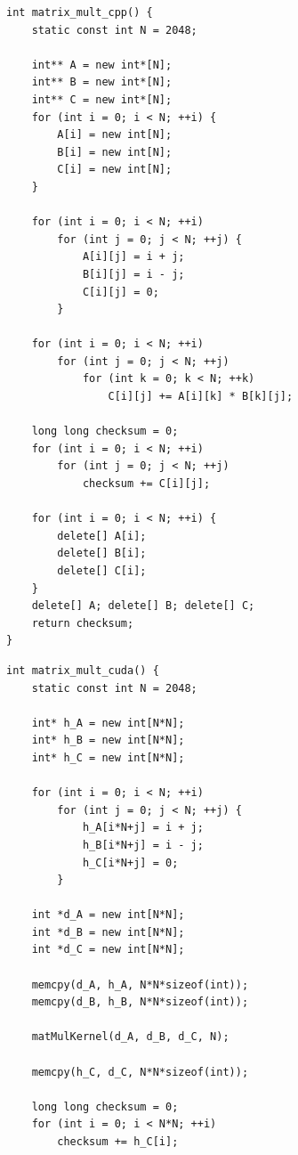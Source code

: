 \documentclass{article}
\begin{document}
\begin{figure}[h]
\begin{minipage}[t]{0.48\linewidth}
\begin{verbatim}
int matrix_mult_cpp() {
    static const int N = 2048;

    int** A = new int*[N];
    int** B = new int*[N];
    int** C = new int*[N];
    for (int i = 0; i < N; ++i) {
        A[i] = new int[N];
        B[i] = new int[N];
        C[i] = new int[N];
    }

    for (int i = 0; i < N; ++i)
        for (int j = 0; j < N; ++j) {
            A[i][j] = i + j;
            B[i][j] = i - j;
            C[i][j] = 0;
        }

    for (int i = 0; i < N; ++i)
        for (int j = 0; j < N; ++j)
            for (int k = 0; k < N; ++k)
                C[i][j] += A[i][k] * B[k][j];

    long long checksum = 0;
    for (int i = 0; i < N; ++i)
        for (int j = 0; j < N; ++j)
            checksum += C[i][j];

    for (int i = 0; i < N; ++i) {
        delete[] A[i];
        delete[] B[i];
        delete[] C[i];
    }
    delete[] A; delete[] B; delete[] C;
    return checksum;
}
\end{verbatim}
\end{minipage}
\hfill
\begin{minipage}[t]{0.48\linewidth}
\begin{verbatim}
int matrix_mult_cuda() {
    static const int N = 2048;

    int* h_A = new int[N*N];
    int* h_B = new int[N*N];
    int* h_C = new int[N*N];

    for (int i = 0; i < N; ++i)
        for (int j = 0; j < N; ++j) {
            h_A[i*N+j] = i + j;
            h_B[i*N+j] = i - j;
            h_C[i*N+j] = 0;
        }

    int *d_A = new int[N*N];
    int *d_B = new int[N*N];
    int *d_C = new int[N*N];

    memcpy(d_A, h_A, N*N*sizeof(int));
    memcpy(d_B, h_B, N*N*sizeof(int));

    matMulKernel(d_A, d_B, d_C, N);

    memcpy(h_C, d_C, N*N*sizeof(int));

    long long checksum = 0;
    for (int i = 0; i < N*N; ++i)
        checksum += h_C[i];


\end{verbatim}
\end{minipage}
\end{figure}
\end{document}
